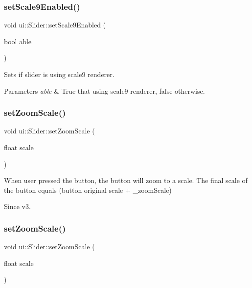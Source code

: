 \subsubsection{\texorpdfstring{set\+Scale9\+Enabled()}{setScale9Enabled()}\hspace{0.1cm}{\footnotesize\ttfamily [2/2]}}
{\footnotesize\ttfamily void ui\+::\+Slider\+::set\+Scale9\+Enabled (\begin{DoxyParamCaption}\item[{bool}]{able }\end{DoxyParamCaption})}

Sets if slider is using scale9 renderer. 
\begin{DoxyParams}{Parameters}
{\em able} & True that using scale9 renderer, false otherwise. \\
\hline
\end{DoxyParams}
\mbox{\label{classui_1_1Slider_ac24c9f8e9eb7431468ed0b9606e420b9}} 
\subsubsection{\texorpdfstring{set\+Zoom\+Scale()}{setZoomScale()}\hspace{0.1cm}{\footnotesize\ttfamily [1/2]}}
{\footnotesize\ttfamily void ui\+::\+Slider\+::set\+Zoom\+Scale (\begin{DoxyParamCaption}\item[{float}]{scale }\end{DoxyParamCaption})}

When user pressed the button, the button will zoom to a scale. The final scale of the button equals (button original scale + \+\_\+zoom\+Scale) \begin{DoxySince}{Since}
v3. 
\end{DoxySince}
\mbox{\label{classui_1_1Slider_ac24c9f8e9eb7431468ed0b9606e420b9}} 
\subsubsection{\texorpdfstring{set\+Zoom\+Scale()}{setZoomScale()}\hspace{0.1cm}{\footnotesize\ttfamily [2/2]}}
{\footnotesize\ttfamily void ui\+::\+Slider\+::set\+Zoom\+Scale (\begin{DoxyParamCaption}\item[{float}]{scale }\end{DoxyParamCaption})}

